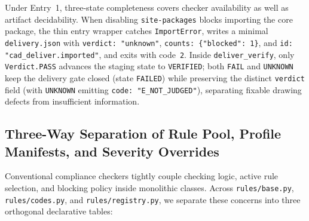 \documentclass[nocopyright,nolists,upint,varvw,hyphenate]{asmejour}
\begin{document}
Under Entry~1, three-state completeness covers checker availability as well as artifact decidability. When disabling \texttt{site-packages} blocks importing the core package, the thin entry wrapper catches \texttt{ImportError}, writes a minimal \texttt{delivery.json} with \texttt{verdict: "unknown"}, \texttt{counts: \{"blocked": 1\}}, and \texttt{id: "cad\_deliver.imported"}, and exits with code~\texttt{2}. Inside \texttt{deliver\_verify}, only \texttt{Verdict.PASS} advances the staging state to \texttt{VERIFIED}; both \texttt{FAIL} and \texttt{UNKNOWN} keep the delivery gate closed (state \texttt{FAILED}) while preserving the distinct \texttt{verdict} field (with \texttt{UNKNOWN} emitting \texttt{code: "E\_NOT\_JUDGED"}), separating fixable drawing defects from insufficient information.

\subsection{Three-Way Separation of Rule Pool, Profile Manifests, and Severity Overrides}\label{sec:three_way_sep}

Conventional compliance checkers tightly couple checking logic, active rule selection, and blocking policy inside monolithic classes. Across \texttt{rules/base.py}, \texttt{rules/codes.py}, and \texttt{rules/registry.py}, we separate these concerns into three orthogonal declarative tables:
\end{document}
